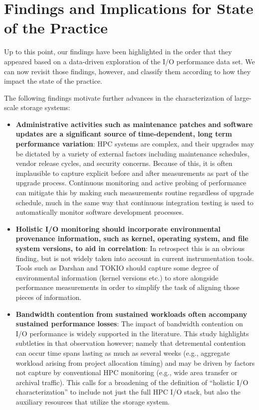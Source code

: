 \section{Findings and Implications for State of the Practice}
\label{sec:findings}

Up to this point, our findings have been highlighted in the order that
they appeared based on a data-driven exploration of the I/O performance
data set.  We can now revisit those findings, however, and classify them
according to how they impact the state of the practice.

The following findings motivate further advances in the characterization of
large-scale storage systems:

\begin{itemize}

\item \textbf{Administrative activities such as maintenance patches and
software updates are a significant source of time-dependent, long term
performance variation}: HPC systems are complex, and their upgrades may be
dictated by a variety of external factors including maintenance schedules,
vendor release cycles, and security concerns.  Because of this, it is often
implausible to capture explicit before and after measurements as part of the
upgrade process.  Continuous monitoring and active probing of performance
can mitigate this by making such measurements routine regardless of upgrade
schedule, much in the same way that continuous integration  testing is used
to automatically monitor software development processes.

\item \textbf{Holistic I/O monitoring should incorporate environmental
provenance information, such as kernel, operating system, and file system
versions, to aid in correlation}: 
In retrospect this is an obvious finding, but is not widely taken into
account in current instrumentation tools.  Tools such as Darshan and
TOKIO should capture some degree of environmental information (kernel
versions etc.) to store alongside performance measurements in order to
simplify the task of aligning those pieces of information.

\item \textbf{Bandwidth contention from sustained workloads often accompany
sustained performance losses}: The impact of bandwidth contention on I/O
performance is widely supported in the literature.  This study highlights
subtleties in that observation however; namely that detremental contention
can occur time spans lasting as much as several weeks (e.g., aggregate
workload arising from project allocation timing) and may be driven by factors 
not capture by conventional HPC monitoring (e.g., wide area transfer or 
archival traffic).  This calls for a broadening of the definition of
``holistic I/O characterization'' to include not just the full HPC I/O
stack, but also the auxiliary resources that utilize the storage system.

\end{itemize}

